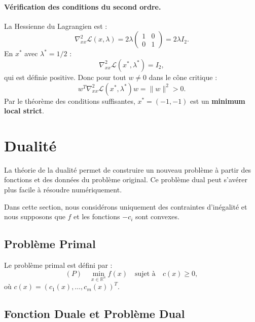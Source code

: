 \begin{exemple}
    \paragraph{Vérification des conditions du second ordre.}
    La Hessienne du Lagrangien est :
    \begin{equation}
        \nabla_{xx}^2 \mathcal{L}(x, \lambda) = 2\lambda \begin{pmatrix} 1 & 0 \\ 0 & 1 \end{pmatrix} = 2\lambda I_2.
    \end{equation}
    En $x^*$ avec $\lambda^* = 1/2$ :
    \begin{equation}
        \nabla_{xx}^2 \mathcal{L}(x^*, \lambda^*) = I_2,
    \end{equation}
    qui est définie positive. Donc pour tout $w \neq 0$ dans le cône critique :
    \begin{equation}
        w^T \nabla_{xx}^2 \mathcal{L}(x^*, \lambda^*) w = \|w\|^2 > 0.
    \end{equation}
    Par le théorème des conditions suffisantes, $x^* = (-1, -1)$ est un \textbf{minimum local strict}.
\end{exemple}

\section{Dualité}

La théorie de la dualité permet de construire un nouveau problème à partir des fonctions et des données du problème original. Ce problème dual peut s'avérer plus facile à résoudre numériquement.

Dans cette section, nous considérons uniquement des contraintes d'inégalité et nous supposons que $f$ et les fonctions $-c_i$ sont convexes.

\subsection{Problème Primal}

Le problème primal est défini par :
\begin{equation}
    (P) \quad \min_{x \in \mathbb{R}^n} f(x) \quad \text{sujet à} \quad c(x) \geq 0,
\end{equation}
où $c(x) = (c_1(x), \dots, c_m(x))^T$.

\subsection{Fonction Duale et Problème Dual}

